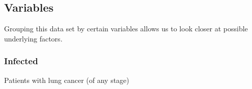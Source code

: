 \documentclass[
]{article}
\newenvironment{Shaded}{\begin{snugshade}}{\end{snugshade}}
\newcommand{\FunctionTok}[1]{\textcolor[rgb]{0.13,0.29,0.53}{\textbf{#1}}}
\newcommand{\NormalTok}[1]{#1}
\newcommand{\OtherTok}[1]{\textcolor[rgb]{0.56,0.35,0.01}{#1}}
\newcommand{\SpecialCharTok}[1]{\textcolor[rgb]{0.81,0.36,0.00}{\textbf{#1}}}
\newcommand{\StringTok}[1]{\textcolor[rgb]{0.31,0.60,0.02}{#1}}
\begin{document}
\subsection{Variables}\label{variables}

Grouping this data set by certain variables allows us to look closer at
possible underlying factors.

\subsubsection{Infected}\label{infected}

Patients with lung cancer (of any stage)

\begin{Shaded}
\end{Shaded}
\end{document}
